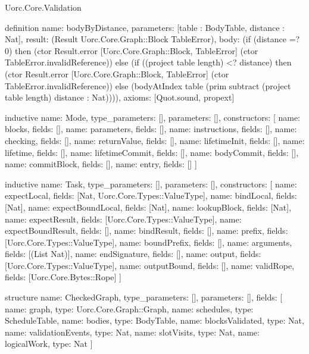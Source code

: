 \begin{lexlean}{Uorc.Core.Validation}
\begin{semanticmodule}
definition{
  name: bodyByDistance,
  parameters: [table : BodyTable, distance : Nat],
  result: (Result Uorc.Core.Graph::Block TableError),
  body: (if (distance =? 0) then (ctor Result.error [Uorc.Core.Graph::Block, TableError] (ctor TableError.invalidReference)) else (if ((project table length) <? distance) then (ctor Result.error [Uorc.Core.Graph::Block, TableError] (ctor TableError.invalidReference)) else (bodyAtIndex table (prim subtract (project table length) distance : Nat)))),
  axioms: [Quot.sound, propext]
}

inductive{
  name: Mode,
  type_parameters: [],
  parameters: [],
  constructors: [
    {name: blocks, fields: []},
    {name: parameters, fields: []},
    {name: instructions, fields: []},
    {name: checking, fields: []},
    {name: returnValue, fields: []},
    {name: lifetimeInit, fields: []},
    {name: lifetime, fields: []},
    {name: lifetimeCommit, fields: []},
    {name: bodyCommit, fields: []},
    {name: commitBlock, fields: []},
    {name: entry, fields: []}
  ]
}

inductive{
  name: Task,
  type_parameters: [],
  parameters: [],
  constructors: [
    {name: expectLocal, fields: [Nat, Uorc.Core.Types::ValueType]},
    {name: bindLocal, fields: [Nat]},
    {name: expectBoundLocal, fields: [Nat]},
    {name: lookupBlock, fields: [Nat]},
    {name: expectResult, fields: [Uorc.Core.Types::ValueType]},
    {name: expectBoundResult, fields: []},
    {name: bindResult, fields: []},
    {name: prefix, fields: [Uorc.Core.Types::ValueType]},
    {name: boundPrefix, fields: []},
    {name: arguments, fields: [(List Nat)]},
    {name: endSignature, fields: []},
    {name: output, fields: [Uorc.Core.Types::ValueType]},
    {name: outputBound, fields: []},
    {name: validRope, fields: [Uorc.Core.Bytes::Rope]}
  ]
}

structure{
  name: CheckedGraph,
  type_parameters: [],
  parameters: [],
  fields: [
    {name: graph, type: Uorc.Core.Graph::Graph},
    {name: schedules, type: ScheduleTable},
    {name: bodies, type: BodyTable},
    {name: blocksValidated, type: Nat},
    {name: validationEvents, type: Nat},
    {name: slotVisits, type: Nat},
    {name: logicalWork, type: Nat}
  ]
}


\end{semanticmodule}
\end{lexlean}
